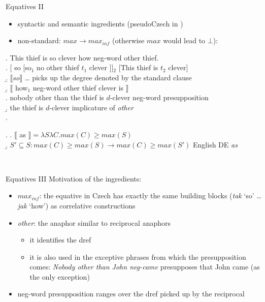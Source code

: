 \documentclass[
  ignorenonframetext,
]{beamer}
\providecommand{\tightlist}{%
  \setlength{\itemsep}{0pt}\setlength{\parskip}{0pt}}
\begin{document}
\begin{frame}
\begin{block}{Equatives II}
\protect\hypertarget{equatives-ii}{}
\begin{itemize}
\tightlist
\item
  syntactic and semantic ingredients (pseudoCzech in \Next)
\item
  non-standard: \(max \rightarrow max_{inf}\) (otherwise \(max\) would
  lead to \(\bot\)): \cite{penka2016degree}
\end{itemize}

\ex. This thief is so clever how neg-word other thief.\\
\a. {[} so {[}so\(_1\) no other thief \(t_1\) clever {]}{]}\(_2\)
{[}This thief is \(t_2\) clever{]}\\
\b. \(\llbracket so\rrbracket\) \ldots{} picks up the degree denoted by
the standard clause\\
\b. \(\llbracket\) how\(_1\) neg-word other thief clever is
\(\rrbracket\)\\
\a. nobody other than the thief is \(d\)-clever \hfill neg-word
presupposition\\
\b. the thief is \(d\)-clever \hfill implicature of \emph{other}\\
\z.

\ex. \a. \(\llbracket\) as
\(\rrbracket = \lambda S\lambda C.max(C) \geq max(S)\)\\
\b.
\(S' \subseteq S: max(C) \geq max(S) \rightarrow max(C) \geq max(S')\)
\hfill English DE \textit{as}

~
\end{block}
\end{frame}

\begin{frame}
\begin{block}{Equatives III}
\protect\hypertarget{equatives-iii}{}
Motivation of the ingredients:

\begin{itemize}
\tightlist
\item
  \(max_{inf}\): the equative in Czech has exactly the same building
  blocks (\emph{tak} `so' \ldots{} \emph{jak} `how') as correlative
  constructions
\item
  \emph{other}: the anaphor similar to reciprocal anaphors

  \begin{itemize}
  \tightlist
  \item
    it identifies the dref
  \item
    it is also used in the exceptive phrases from which the
    presupposition comes: \emph{Nobody other than John neg-came}
    presupposes that John came (as the only exception)
  \end{itemize}
\item
  neg-word presupposition ranges over the dref picked up by the
  reciprocal
\end{itemize}
\end{block}
\end{frame}
\end{document}
